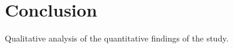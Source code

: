 \section{Conclusion}
\label{conclusion}

Qualitative analysis of the quantitative findings of the study.
